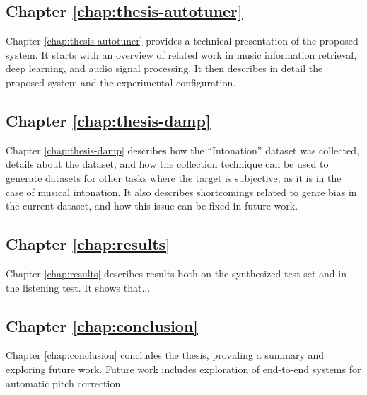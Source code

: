 \subsection{Chapter \ref{chap:thesis-autotuner}}
Chapter \ref{chap:thesis-autotuner} provides a technical presentation of the proposed system. It starts with an overview of related work in music information retrieval, deep learning, and audio signal processing. It then describes in detail the proposed system and the experimental configuration.

\subsection{Chapter \ref{chap:thesis-damp}}
Chapter \ref{chap:thesis-damp} describes how the ``Intonation'' dataset was collected, details about the dataset, and how the collection technique can be used to generate datasets for other tasks where the target is subjective, as it is in the case of musical intonation. It also describes shortcomings related to genre bias in the current dataset, and how this issue can be fixed in future work.

\subsection{Chapter \ref{chap:results}}
Chapter \ref{chap:results} describes results both on the synthesized test set and in the listening test. It shows that...

\subsection{Chapter \ref{chap:conclusion}}
Chapter \ref{chap:conclusion} concludes the thesis, providing a summary and exploring future work. Future work includes exploration of end-to-end systems for automatic pitch correction. 




